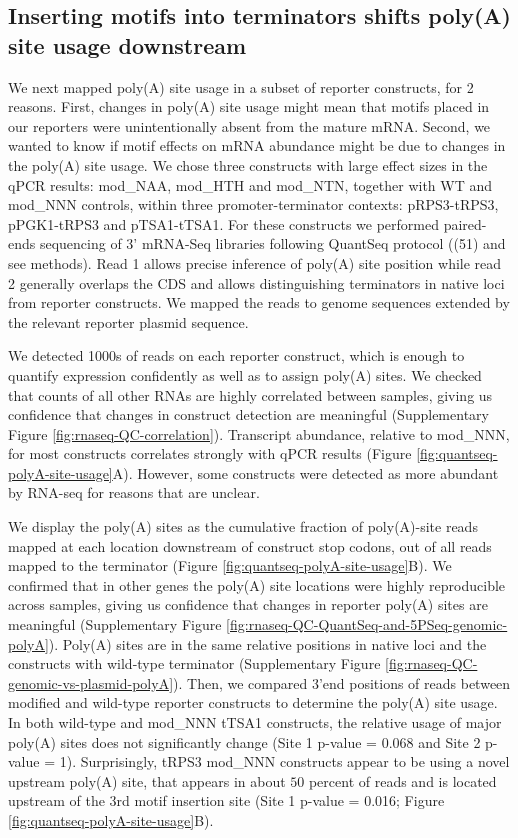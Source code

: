 \documentclass{SBCbookchapter}
\begin{document}
\subsection{Inserting motifs into terminators shifts poly(A) site usage downstream}

We next mapped poly(A) site usage in a subset of reporter constructs, for 2 reasons.
First, changes in poly(A) site usage might mean that motifs placed in our reporters were unintentionally absent from the mature mRNA.
Second, we wanted to know if motif effects on mRNA abundance might be due to changes in the poly(A) site usage.
We chose three constructs with large effect sizes in the qPCR results: mod\_NAA, mod\_HTH and mod\_NTN, together with WT and mod\_NNN controls, within three promoter-terminator contexts: pRPS3-tRPS3, pPGK1-tRPS3 and pTSA1-tTSA1.
For these constructs we performed paired-ends sequencing of 3' mRNA-Seq libraries following QuantSeq protocol ((51) and see methods).
Read 1 allows precise inference of poly(A) site position while read 2 generally overlaps the CDS and allows distinguishing terminators in native loci from reporter constructs.
We mapped the reads to genome sequences extended by the relevant reporter plasmid sequence.

We detected 1000s of reads on each reporter construct, which is enough to quantify expression confidently as well as to assign poly(A) sites.
We checked that counts of all other RNAs are highly correlated between samples, giving us confidence that changes in construct detection are meaningful (Supplementary Figure \ref{fig:rnaseq-QC-correlation}).
Transcript abundance, relative to mod\_NNN, for most constructs correlates strongly with qPCR results (Figure \ref{fig:quantseq-polyA-site-usage}A).
However, some constructs were detected as more abundant by RNA-seq for reasons that are unclear.

We display the poly(A) sites as the cumulative fraction of poly(A)-site reads mapped at each location downstream of construct stop codons, out of all reads mapped to the terminator (Figure \ref{fig:quantseq-polyA-site-usage}B).
We confirmed that in other genes the poly(A) site locations were highly reproducible across samples, giving us confidence that changes in reporter poly(A) sites are meaningful (Supplementary Figure \ref{fig:rnaseq-QC-QuantSeq-and-5PSeq-genomic-polyA}).
Poly(A) sites are in the same relative positions in native loci and the constructs with wild-type terminator (Supplementary Figure \ref{fig:rnaseq-QC-genomic-vs-plasmid-polyA}).
Then, we compared 3'end positions of reads between modified and wild-type reporter constructs to determine the poly(A) site usage.
In both wild-type and mod\_NNN tTSA1 constructs, the relative usage of major poly(A) sites does not significantly change (Site 1 p-value = 0.068 and Site 2 p-value = 1).
Surprisingly, tRPS3 mod\_NNN constructs appear to be using a novel upstream poly(A) site, that appears in about \(50%
\) percent of reads and is located upstream of the 3rd motif insertion site (Site 1 p-value = 0.016; Figure \ref{fig:quantseq-polyA-site-usage}B).
\end{document}
